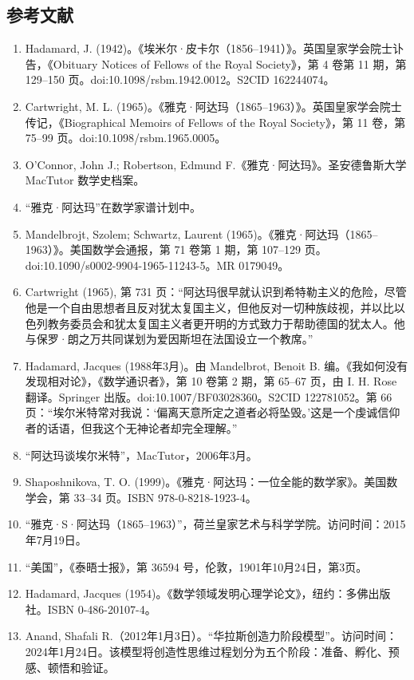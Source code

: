 \subsection{参考文献}
\begin{enumerate}
\item Hadamard, J. (1942)。《埃米尔·皮卡尔（1856–1941）》。英国皇家学会院士讣告，《Obituary Notices of Fellows of the Royal Society》，第 4 卷第 11 期，第 129–150 页。doi:10.1098/rsbm.1942.0012。S2CID 162244074。
\item Cartwright, M. L. (1965)。《雅克·阿达玛（1865–1963）》。英国皇家学会院士传记，《Biographical Memoirs of Fellows of the Royal Society》，第 11 卷，第 75–99 页。doi:10.1098/rsbm.1965.0005。
\item O'Connor, John J.; Robertson, Edmund F.《雅克·阿达玛》。圣安德鲁斯大学 MacTutor 数学史档案。
\item “雅克·阿达玛”在数学家谱计划中。
\item Mandelbrojt, Szolem; Schwartz, Laurent (1965)。《雅克·阿达玛（1865–1963）》。美国数学会通报，第 71 卷第 1 期，第 107–129 页。doi:10.1090/s0002-9904-1965-11243-5。MR 0179049。
\item Cartwright (1965), 第 731 页：“阿达玛很早就认识到希特勒主义的危险，尽管他是一个自由思想者且反对犹太复国主义，但他反对一切种族歧视，并以比以色列教务委员会和犹太复国主义者更开明的方式致力于帮助德国的犹太人。他与保罗·朗之万共同谋划为爱因斯坦在法国设立一个教席。”
\item Hadamard, Jacques (1988年3月)。由 Mandelbrot, Benoit B. 编。《我如何没有发现相对论》，《数学通识者》，第 10 卷第 2 期，第 65–67 页，由 I. H. Rose 翻译。Springer 出版。doi:10.1007/BF03028360。S2CID 122781052。第 66 页：“埃尔米特常对我说：‘偏离天意所定之道者必将坠毁。’这是一个虔诚信仰者的话语，但我这个无神论者却完全理解。”
\item “阿达玛谈埃尔米特”，MacTutor，2006年3月。
\item Shaposhnikova, T. O. (1999)。《雅克·阿达玛：一位全能的数学家》。美国数学会，第 33–34 页。ISBN 978-0-8218-1923-4。
\item “雅克·S·阿达玛（1865–1963）”，荷兰皇家艺术与科学学院。访问时间：2015年7月19日。
\item “美国”，《泰晤士报》，第 36594 号，伦敦，1901年10月24日，第3页。
\item Hadamard, Jacques (1954)。《数学领域发明心理学论文》，纽约：多佛出版社。ISBN 0-486-20107-4。
\item Anand, Shafali R.（2012年1月3日）。“华拉斯创造力阶段模型”。访问时间：2024年1月24日。该模型将创造性思维过程划分为五个阶段：准备、孵化、预感、顿悟和验证。

\end{enumerate}
